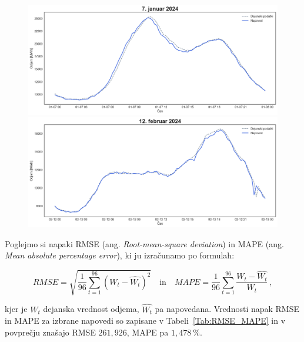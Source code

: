 \documentclass[a4paper, 11pt]{article}
\begin{document}
\begin{figure}[!ht]
    \centering
    \begin{minipage}[c]{0.48\linewidth}
        \includegraphics[width=\linewidth]{napoved_5.png}
    \end{minipage}
    \hfill
    \begin{minipage}[c]{0.48\linewidth}
        \includegraphics[width=\linewidth]{napoved_6.png}
    \end{minipage}
\end{figure}

\noindent Poglejmo si napaki RMSE (ang. \emph{Root-mean-square deviation}) in 
MAPE (ang. \emph{Mean absolute percentage error}), ki ju izračunamo po formulah:



$$
RMSE = \sqrt{\frac{1}{96}\sum_{t=1}^{96}{(W_t-\hat{W_t})^2}} \quad \textrm{in} \quad
MAPE = \frac{1}{96}\sum_{t=1}^{96}{\frac{W_t-\hat{W_t}}{W_t}} \,,
$$

\noindent kjer je $W_t$ dejanska vrednost odjema, $\hat{W_t}$ pa napovedana. 
Vrednosti napak RMSE in MAPE za izbrane napovedi so zapisane v Tabeli~\ref{Tab:RMSE_MAPE} in 
v povprečju znašajo RMSE $261{,}926$, MAPE pa $1{,}478~\%$.
\end{document}
